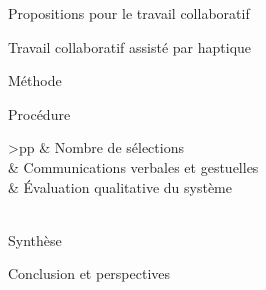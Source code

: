 \documentclass[myfrancais]{mythesis}
\begin{document}
\begin{mypart}{Propositions pour le travail collaboratif}
\begin{mychapter}{Travail collaboratif assisté par haptique}
\begin{mysection}{Méthode}
\begin{mysubsection}{Procédure}
\begin{mytable}
\begin{mytabular}{>{\bfseries}p{\expfourfirstcolumn}p{\expfoursecondcolumn}}
							                                          &  Nombre de sélections                                           \\
							                                          &  Communications verbales et gestuelles                          \\
							                                          &  Évaluation qualitative du système                              \\
							\mymiddlerule[\heavyrulewidth]
							 \\
							\mybottomrule
						\end{mytabular}
					\end{mytable}
				\end{mysubsection}
			\end{mysection}
		\end{mychapter}
	\end{mypart}
	\begin{mypart}{Synthèse}
		\begin{mychapter}{Conclusion et perspectives}
		\end{mychapter}
	\end{mypart}
\end{document}
